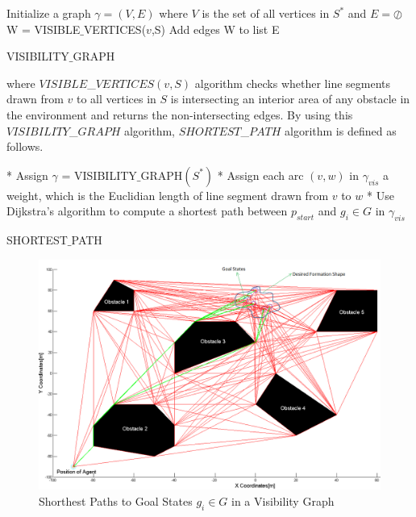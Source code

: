 \begin{algorithm}[H]
Initialize a graph $\gamma = (V,E)$ where $V$ is the set of all vertices in $S^*$ and $E = \oslash$  \\
{		
W = VISIBLE$\_$VERTICES($v$,S)\;
Add edges W to list E\;
}\

\caption{VISIBILITY$\_$GRAPH}
\end{algorithm}

where $VISIBLE$\_$VERTICES(v,S)$ algorithm checks whether line segments drawn from $v$ to all vertices in $S$ is intersecting an interior area of any obstacle in the environment and returns the non-intersecting edges.  By using this $VISIBILITY$\_$GRAPH$ algorithm, $SHORTEST$\_$PATH$ algorithm is defined as follows. \newline
	
\begin{algorithm}[H]
* Assign $\gamma$ = VISIBILITY$\_$GRAPH$(S^*)$ \newline
* Assign each arc $(v,w)$ in $\gamma_{vis}$ a weight, which is the Euclidian length of line segment drawn from $v$ to $w$ \newline
{}
{
* Use Dijkstra's algorithm to compute a shortest path between $p_{start}$ and $g_i \in G$ in $\gamma_{vis}$
}
\caption{SHORTEST$\_$PATH}
\end{algorithm}
  
\vspace{2cm}

\begin{figure}[H]
\caption{Shorthest Paths to Goal States $g_i \in G$ in a Visibility Graph} \label{dijksttae_visibility}
\centering
\includegraphics[scale = 0.40]{visgraph2}
\end{figure} 

